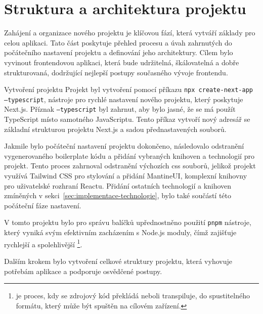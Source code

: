 \section{Struktura a architektura projektu}
\label{sec:implementace-architektura}
Zahájení a organizace nového projektu je klíčovou fází, která vytváří základy pro celou aplikaci.
Tato část poskytuje přehled procesu a úvah zahrnutých do počátečního nastavení projektu a definování jeho architektury.
Cílem bylo vyvinout frontendovou aplikaci, která bude udržitelná, škálovatelná a dobře strukturovaná, dodržující nejlepší postupy současného vývoje frontendu.

\begin{subsection}{Vytvoření projektu}
    \label{subsec:implementace-architektura-vytvoreni-projektu}
    Projekt byl vytvoření pomocí příkazu \texttt{npx create-next-app --typescript}, nástroje pro rychlé nastavení nového projektu, který poskytuje Next.js.
    Příznak \texttt{--typescript} byl zahrnut, aby bylo jasné, že se má použít TypeScript místo samotného JavaScriptu.
    Tento příkaz vytvoří nový adresář se základní strukturou projektu Next.js a sadou přednastavených souborů\cite{n_nextjs_org_docs}.

    Jakmile bylo počáteční nastavení projektu dokončeno, následovalo odstranění vygenerovaného boilerplate kódu a přidání vybraných knihoven a technologií pro projekt.
    Tento proces zahrnoval odstranění výchozích \ac{css} souborů, jelikož projekt využívá Tailwind CSS pro stylování a přidání MantineUI, komplexní knihovny pro uživatelské rozhraní Reactu.
    Přidání ostatních technologií a knihoven zmíněných v sekci~\ref{sec:implementace-technologie}, bylo také součástí této počáteční fáze nastavení.

    V tomto projektu bylo pro správu balíčků upřednostněno použití \texttt{pnpm} nástroje, který vyniká svým efektivním zacházením s Node.js moduly, čímž zajišťuje rychlejší a spolehlivější \footnote{ je proces, kdy se zdrojový kód překládá neboli transpiluje, do spustitelného formátu, který může být spuštěn na cílovém zařízení.}\cite{p__pnpm_io}.

    Dalším krokem bylo vytvoření celkové struktury projektu, která vyhovuje potřebám aplikace a podporuje osvědčené postupy.
\end{subsection}
\pagebreak

